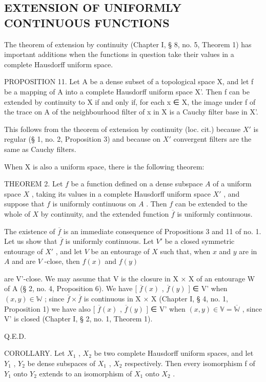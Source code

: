 \subsection{EXTENSION OF UNIFORMLY CONTINUOUS FUNCTIONS}

The theorem of extension by continuity (Chapter I, § 8, no. 5, Theorem 1) has important additions when the functions in question take their values in a complete Hausdorff uniform space.

PROPOSITION 11. Let A be a dense subset of a topological space X, and let f be a mapping of A into a complete Hausdorff uniform space X'. Then f can be extended by continuity to X if and only if, for each x ∈ X, the image under f of the trace on A of the neighbourhood filter of x in X is a Cauchy filter base in X'.

This follows from the theorem of extension by continuity (loc. cit.) because \(X'\) is regular (§ 1, no. 2, Proposition 3) and because on \(X'\) convergent filters are the same as Cauchy filters.

When X is also a uniform space, there is the following theorem:

THEOREM 2. Let \(f\) be a function defined on a dense subspace \(A\) of a uniform space \(X\) , taking its values in a complete Hausdorff uniform space \(X'\) , and suppose that \(f\) is uniformly continuous on \(A\) . Then \(f\) can be extended to the whole of \(X\) by continuity, and the extended function \(\overline{f}\) is uniformly continuous.

The existence of \(\overline{f}\) is an immediate consequence of Propositions 3 and 11 of no. 1. Let us show that \(\overline{f}\) is uniformly continuous. Let \(V'\) be a closed symmetric entourage of \(X'\) , and let \(V\) be an entourage of \(X\) such that, when \(x\) and \(y\) are in \(A\) and are \(V\) -close, then \(f(x)\) and \(f(y)\)

are V'-close. We may assume that V is the closure in X × X of an entourage W of A (§ 2, no. 4, Proposition 6). We have {[} \(\overline{f}(x)\) , \(\overline{f}(y)\) {]} ∈ V' when \((x,y) \in \mathbb{W}\) ; since \(\overline{f} \times \overline{f}\) is continuous in X × X (Chapter I, § 4, no. 1, Proposition 1) we have also {[} \(\overline{f}(x)\) , \(\overline{f}(y)\) {]} ∈ V' when \((x,y) \in \mathbb{V} = \overline{\mathbb{W}}\) , since V' is closed (Chapter I, § 2, no. 1, Theorem 1).

Q.E.D.

COROLLARY. Let \(X_{1}\) , \(X_{2}\) be two complete Hausdorff uniform spaces, and let \(Y_{1}\) , \(Y_{2}\) be dense subspaces of \(X_{1}\) , \(X_{2}\) respectively. Then every isomorphism f of \(Y_{1}\) onto \(Y_{2}\) extends to an isomorphism of \(X_{1}\) onto \(X_{2}\) .

